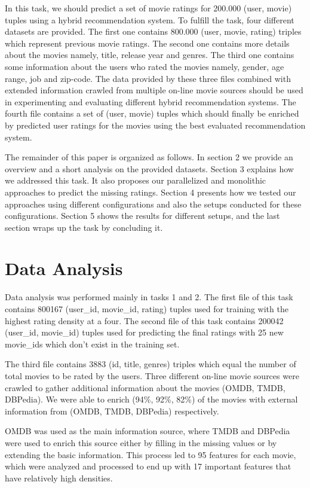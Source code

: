 \documentclass{sigish}
\begin{document}
In this task, we should predict a set of movie ratings for 200.000 (user, movie) tuples using a hybrid recommendation system. To fulfill the task, four different datasets are provided. The first one contains 800.000 (user, movie, rating) triples which represent previous movie ratings. The second one contains more details about the movies namely, title, release year and genres. The third one contains some information about the users who rated the movies namely, gender, age range, job and zip-code. The data provided by these three files combined with extended information crawled from multiple on-line movie sources should be used in experimenting and evaluating different hybrid recommendation systems. The fourth file contains a set of (user, movie) tuples which should finally be enriched by predicted user ratings for the movies using the best evaluated recommendation system.

The remainder of this paper is organized as follows. In section 2 we provide an overview and a short analysis on the provided datasets. Section 3 explains how we addressed this task. It also proposes our parallelized and monolithic approaches to predict the missing ratings. Section 4 presents how we tested our approaches using different configurations and also the setups conducted for these configurations. Section 5 shows the results for different setups, and the last section wraps up the task by concluding it.

\section{Data Analysis}

Data analysis was performed mainly in tasks 1 and 2. The first file of this task contains 800167 (user\_id, movie\_id, rating) tuples used for training with the highest rating density at a four. The second file of this task contains 200042 (user\_id, movie\_id) tuples used for predicting the final ratings with 25 new movie\_ids which don't exist in the training set.

The third file contains 3883 (id, title, genres) triples which equal the number of total movies to be rated by the users. Three different on-line movie sources were crawled to gather additional information about the movies (OMDB, TMDB, DBPedia). We were able to enrich (94\%, 92\%, 82\%) of the movies with external information from (OMDB, TMDB, DBPedia) respectively.

OMDB was used as the main information source, where TMDB and DBPedia were used to enrich this source either by filling in the missing values or by extending the basic information. This process led to 95 features for each movie, which were analyzed and processed to end up with 17 important features that have relatively high densities.
\end{document}
